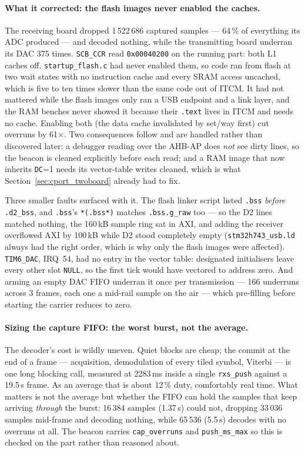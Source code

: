 \paragraph{What it corrected: the flash images never enabled the
caches.} The receiving board dropped 1\,522\,686 captured samples ---
64\,\% of everything its ADC produced --- and decoded nothing, while the
transmitting board underran its DAC 375 times. \texttt{SCB\_CCR} read
\texttt{0x00040200} on the running part: both L1 caches off.
\texttt{startup\_flash.c} had never enabled them, so code ran from flash
at two wait states with no instruction cache and every SRAM access
uncached, which is five to ten times slower than the same code out of
ITCM. It had not mattered while the flash images only ran a USB endpoint
and a link layer, and the RAM benches never showed it because their
\texttt{.text} lives in ITCM and needs no cache. Enabling both (the data
cache invalidated by set/way first) cut overruns by 61$\times$. Two
consequences follow and are handled rather than discovered later: a
debugger reading over the AHB-AP does \emph{not} see dirty lines, so the
beacon is cleaned explicitly before each read; and a RAM image that now
inherits \texttt{DC}=1 needs its vector-table writes cleaned, which is
what Section~\ref{sec:cport_twoboard} already had to fix.

Three smaller faults surfaced with it. The flash linker script listed
\texttt{.bss} \emph{before} \texttt{.d2\_bss}, and \texttt{.bss}'s
\texttt{*(.bss*)} matches \texttt{.bss.g\_raw} too --- so the D2 lines
matched nothing, the 160\,kB sample ring sat in AXI, and adding the
receiver overflowed AXI by 100\,kB while D2 stood completely empty
(\texttt{stm32h743\_usb.ld} always had the right order, which is why only
the flash images were affected). \texttt{TIM6\_DAC}, IRQ~54, had no entry
in the vector table: designated initialisers leave every other slot
\texttt{NULL}, so the first tick would have vectored to address zero.
And arming an empty DAC FIFO underran it once per transmission ---
166 underruns across 3 frames, each one a mid-rail sample on the air ---
which pre-filling before starting the carrier reduces to zero.

\paragraph{Sizing the capture FIFO: the worst burst, not the average.}
The decoder's cost is wildly uneven. Quiet blocks are cheap; the commit
at the end of a frame --- acquisition, demodulation of every tiled
symbol, Viterbi --- is one long blocking call, measured at 2283\,ms
inside a single \texttt{rxs\_push} against a 19.5\,s frame. As an
average that is about 12\,\% duty, comfortably real time. What matters
is not the average but whether the FIFO can hold the samples that keep
arriving \emph{through} the burst: 16\,384 samples (1.37\,s) could not,
dropping 33\,036 samples mid-frame and decoding nothing, while 65\,536
(5.5\,s) decodes with no overruns at all. The beacon carries
\texttt{cap\_overruns} and \texttt{push\_ms\_max} so this is checked on
the part rather than reasoned about.


